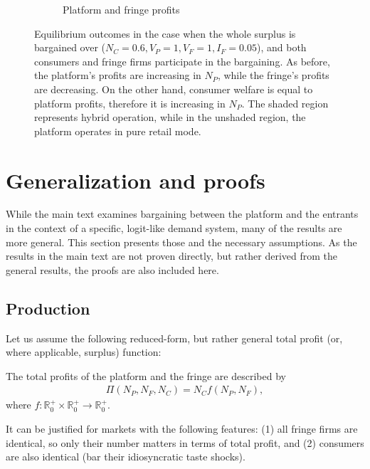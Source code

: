 \begin{figure}
\begin{subfigure}[b]{0.45\textwidth}
        \caption{Platform and fringe profits}
        \label{fig:profits_full_surplus_two_sided}
    \end{subfigure}
    \caption{Equilibrium outcomes in the case when the whole surplus is bargained over ($N_C = 0.6, V_P = 1, V_F = 1, I_F = 0.05$), and both consumers and fringe firms participate in the bargaining. As before, the platform's profits are increasing in $N_P$, while the fringe's profits are decreasing. On the other hand, consumer welfare is equal to platform profits, therefore it is increasing in $N_P$. The shaded region represents hybrid operation, while in the unshaded region, the platform operates in pure retail mode.}
    \label{fig:equilibrium_full_surplus_two_sided}
\end{figure}



\section{Generalization and proofs}
\label{sec:more_general}

While the main text examines bargaining between the platform and the entrants in the context of a specific, logit-like demand system, many of the results are more general.
This section presents those and the necessary assumptions.
As the results in the main text are not proven directly, but rather derived from the general results, the proofs are also included here.

\subsection{Production}
\label{sec:more_general_production}

Let us assume the following reduced-form, but rather general total profit (or, where applicable, surplus) function:
\begin{assumption}
    \label{ass:identical_fringe}
    The total profits of the platform and the fringe are described by 
    \begin{align*}
        \Pi(N_P, N_F, N_C) = N_C f(N_P, N_F),
    \end{align*}
    where $f: \mathbb{R}^+_0 \times \mathbb{R}^+_0 \to \mathbb{R}^+_0$.
\end{assumption}
It can be justified for markets with the following features: (1) all fringe firms are identical, so only their number matters in terms of total profit, and (2) consumers are also identical (bar their idiosyncratic taste shocks).

